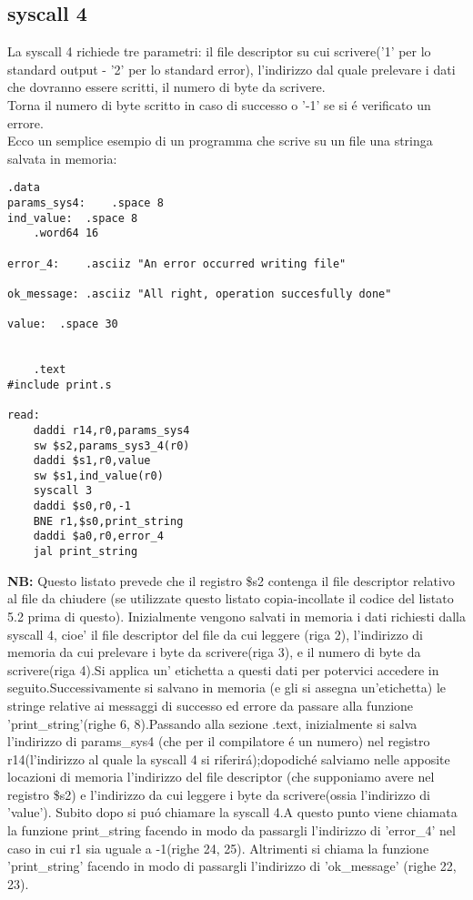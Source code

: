 \documentclass[12pt]{report}
\newcommand{\OF}{\textbf{NB:} Questo listato prevede che il registro \$s2 contenga il file descriptor
relativo al file da chiudere (se utilizzate questo listato copia-incollate il codice del listato 5.2 prima di questo).}
\begin{document}
\subsection{syscall 4}
La syscall 4 richiede tre parametri: il file descriptor su cui scrivere('1' per lo standard output - '2' per lo standard error), 
l’indirizzo dal quale prelevare i dati che dovranno essere scritti, il numero di byte da scrivere.\\
Torna il numero di byte scritto in caso di successo o '-1' se si \'{e} verificato un errore.\\ 
Ecco un semplice esempio di un programma che scrive su un file una stringa salvata in memoria:
\begin{lstlisting}[caption={syscall4}, label={code:syscall4}, style={mips}]
      		.data
params_sys4:	.space 8			
ind_value:	.space 8			
	.word64 16		

error_4:	.asciiz "An error occurred writing file"	

ok_message:	.asciiz "All right, operation succesfully done"	

value:	.space 30								


	.text
#include print.s	

read:
	daddi r14,r0,params_sys4
	sw $s2,params_sys3_4(r0)
	daddi $s1,r0,value	
	sw $s1,ind_value(r0)	
	syscall 3			
	daddi $s0,r0,-1			
	BNE r1,$s0,print_string
	daddi $a0,r0,error_4
	jal print_string				
\end{lstlisting}
\OF{}
Inizialmente vengono salvati in memoria i dati richiesti dalla syscall 4, cioe'
il file descriptor del file da cui leggere (riga 2), l'indirizzo di memoria da
cui prelevare i byte da scrivere(riga 3), e il numero di byte da scrivere(riga
4).Si applica un' etichetta a questi dati per potervici accedere in
seguito.Successivamente si salvano in memoria (e gli si assegna un'etichetta) le
stringe relative ai messaggi di successo ed errore da passare alla funzione
'print\_string'(righe 6, 8).Passando alla sezione .text, inizialmente si salva
l'indirizzo di params\_sys4 (che per il compilatore \'{e} un numero) nel
registro r14(l'indirizzo al quale la syscall 4 si riferir\'{a});dopodich\'{e}
salviamo nelle apposite locazioni di memoria l'indirizzo del file descriptor
(che supponiamo avere nel registro \$s2) e l'indirizzo da cui leggere i byte da
scrivere(ossia l'indirizzo di 'value').  Subito dopo si pu\'{o} chiamare la
syscall 4.A questo  punto viene chiamata la funzione print\_string facendo in
modo da passargli l'indirizzo di 'error\_4' nel caso in cui r1 sia uguale a
-1(righe 24, 25). Altrimenti si chiama la funzione 'print\_string' facendo in
modo di passargli l'indirizzo di 'ok\_message' (righe 22, 23).
\end{document}
